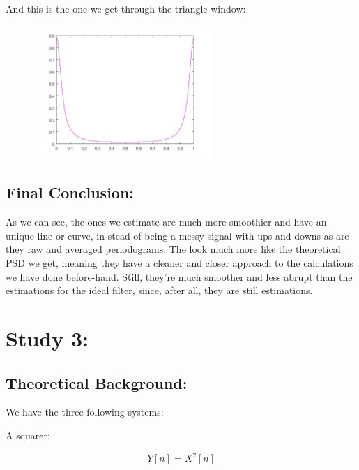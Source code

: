 \documentclass[a4paper,11pt]{article}
\begin{document}
And this is the one we get through the triangle window:

\begin{figure}[!hp]
    \begin{center}
    \includegraphics[width=0.6\textwidth]{images/lab2_figure14.jpg}
    \end{center}
\end{figure}

\newpage

\subsection{Final Conclusion:}

As we can see, the ones we estimate are much more smoothier and have an unique line or curve, in stead of being a messy signal with ups and downs as are they raw and averaged periodograms. The look much more like the theoretical PSD we get, meaning they have a cleaner and closer approach to the calculations we have done before-hand. Still, they're much smoother and less abrupt than the estimations for the ideal filter, since, after all, they are still estimations.

\newpage

\section{Study 3:}

\subsection{Theoretical Background:}

We have the three following systems:

A squarer:

\begin{equation}
  Y[n] =X^2[n]
\end{equation}
\end{document}
